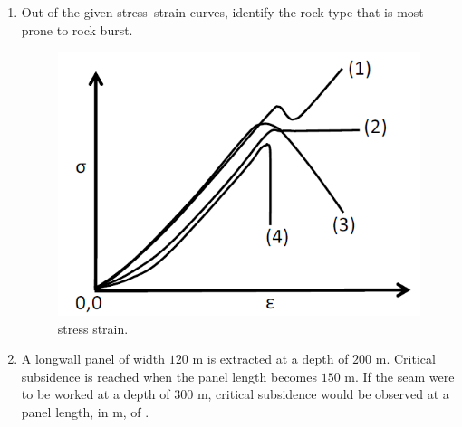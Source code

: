 \documentclass[journal]{IEEEtran}
\begin{document}
\begin{enumerate}
\begin{enumerate}
\end{enumerate}
  \hfill{}

\item Out of the given stress–strain curves, identify the rock type that is most prone to rock burst.

\begin{figure}[h!]
    \centering
    \includegraphics[width=0.7\linewidth]{figs/stress_strain.png}
    \caption{stress strain.}
    \label{fig:stress_strain}
\end{figure}

\begin{enumerate}
\end{enumerate}
\hfill{}

\item A longwall panel of width $120$ m is extracted at a depth of $200$ m. Critical subsidence is reached when the panel length becomes $150$ m. If the seam were to be worked at a depth of $300$ m, critical subsidence would be observed at a panel length, in m, of \underline{\hspace{1.5cm}}.


\end{enumerate}
\end{document}
